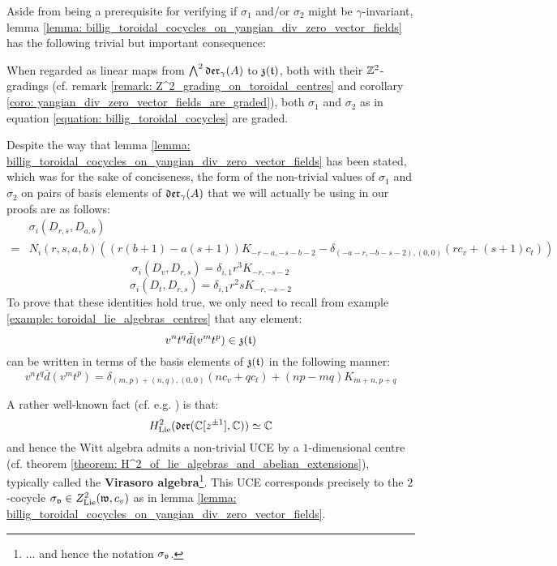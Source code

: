         Aside from being a prerequisite for verifying if $\sigma_1$ and/or $\sigma_2$ might be $\gamma$-invariant, lemma \ref{lemma: billig_toroidal_cocycles_on_yangian_div_zero_vector_fields} has the following trivial but important consequence:
        \begin{corollary} \label{coro: billig_toroidal_cocycles_are_graded}
            When regarded as linear maps from $\bigwedge^2 \mathfrak{der}_{\gamma}(A)$ to $\mathfrak{z}(\mathfrak{t})$, both with their $\mathbb{Z}^2$-gradings (cf. remark \ref{remark: Z^2_grading_on_toroidal_centres} and corollary \ref{coro: yangian_div_zero_vector_fields_are_graded}), both $\sigma_1$ and $\sigma_2$ as in equation \eqref{equation: billig_toroidal_cocycles} are graded. 
        \end{corollary}
        \begin{remark}
            Despite the way that lemma \ref{lemma: billig_toroidal_cocycles_on_yangian_div_zero_vector_fields} has been stated, which was for the sake of conciseness, the form of the non-trivial values of $\sigma_1$ and $\sigma_2$ on pairs of basis elements of $\mathfrak{der}_{\gamma}(A)$ that we will actually be using in our proofs are as follows:
                $$
                    \begin{aligned}
                        & \sigma_i(D_{r, s}, D_{a, b})
                        \\
                        = & N_i(r, s, a, b) \left( ( r(b + 1) - a(s + 1) )K_{-r - a, -s - b - 2} - \delta_{ (-a - r, -b - s - 2), (0, 0) } (r c_v + (s + 1) c_t) \right)
                    \end{aligned}
                $$
                $$\sigma_i(D_v, D_{r, s}) = \delta_{i, 1} r^3 K_{-r, -s - 2}$$
                $$\sigma_i(D_t, D_{r, s}) = \delta_{i, 1} r^2 s K_{-r, -s - 2}$$
            To prove that these identities hold true, we only need to recall from example \ref{example: toroidal_lie_algebras_centres} that any element:
                $$v^n t^q \bar{d}(v^m t^p) \in \mathfrak{z}(\mathfrak{t})$$
            can be written in terms of the basis elements of $\mathfrak{z}(\mathfrak{t})$ in the following manner:
                $$v^n t^q \bar{d}(v^m t^p) = \delta_{(m, p) + (n, q), (0, 0)} ( n c_v + q c_t ) + (np - mq) K_{m + n, p + q}$$
        \end{remark}
        \begin{remark} \label{remark: billig_toroidal_cocycles_on_the_witt_algebra}
            A rather well-known fact (cf. e.g. \cite[Proposition 1.3]{kac_raina_rozhkovskaya_bombay_lectures_on_highest_weight_modules_of_infinite_dimensional_lie_algebras}) is that:
                $$H^2_{\mathrm{Lie}}(\mathfrak{der}(\mathbb{C}[z^{\pm 1}], \mathbb{C})) \simeq \mathbb{C}$$
            and hence the Witt algebra admits a non-trivial UCE by a $1$-dimensional centre (cf. theorem \ref{theorem: H^2_of_lie_algebras_and_abelian_extensions}), typically called the \textbf{Virasoro algebra}\footnote{... and hence the notation $\sigma_{\mathfrak{v}}$.}. This UCE corresponds precisely to the $2$-cocycle $\sigma_{\mathfrak{v}} \in Z^2_{\mathrm{Lie}}(\mathfrak{w}, c_v)$ as in lemma \ref{lemma: billig_toroidal_cocycles_on_yangian_div_zero_vector_fields}. 
        \end{remark}

